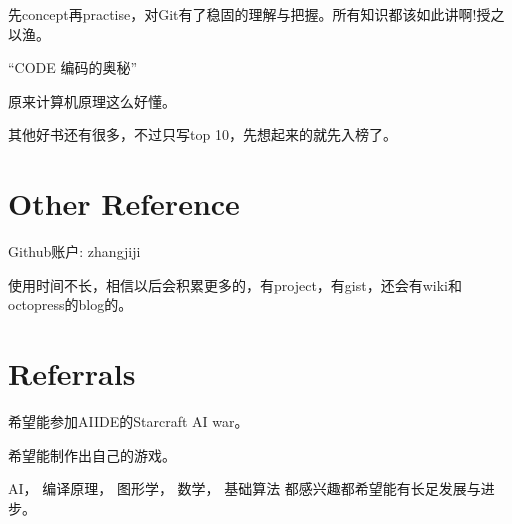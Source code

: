 \documentclass{article}
\begin{document}
\begin{CJK*}{UTF8}{gbsn}
先concept再practise，对Git有了稳固的理解与把握。所有知识都该如此讲啊!授之以渔。

``CODE 编码的奥秘''

原来计算机原理这么好懂。

其他好书还有很多，不过只写top 10，先想起来的就先入榜了。

\section{Other Reference}

Github账户: zhangjiji

使用时间不长，相信以后会积累更多的，有project，有gist，还会有wiki和octopress的blog的。

\section{Referrals}

希望能参加AIIDE的Starcraft AI war。

希望能制作出自己的游戏。

AI， 编译原理， 图形学， 数学， 基础算法 都感兴趣都希望能有长足发展与进步。

\end{CJK*}
\end{document}
